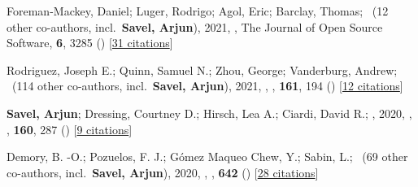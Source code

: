\item[{\color{numcolor}\scriptsize4}] Foreman-Mackey, Daniel; Luger, Rodrigo; Agol, Eric; Barclay, Thomas; \etal\ ({12} other co-authors, incl.\ \textbf{Savel, Arjun}), 2021, , The Journal of Open Source Software, \textbf{6}, 3285 () [\href{https://ui.adsabs.harvard.edu/abs/2021JOSS....6.3285F}{31 citations}]

\item[{\color{numcolor}\scriptsize3}] Rodriguez, Joseph E.; Quinn, Samuel N.; Zhou, George; Vanderburg, Andrew; \etal\ ({114} other co-authors, incl.\ \textbf{Savel, Arjun}), 2021, , \aj, \textbf{161}, 194 () [\href{https://ui.adsabs.harvard.edu/abs/2021AJ....161..194R}{12 citations}]

\item[{\color{numcolor}\scriptsize2}] \textbf{Savel, Arjun}; Dressing, Courtney D.; Hirsch, Lea A.; Ciardi, David R.; \etal, 2020, , \aj, \textbf{160}, 287 () [\href{https://ui.adsabs.harvard.edu/abs/2020AJ....160..287S}{9 citations}]

\item[{\color{numcolor}\scriptsize1}] Demory, B. -O.; Pozuelos, F. J.; G{\'o}mez Maqueo Chew, Y.; Sabin, L.; \etal\ ({69} other co-authors, incl.\ \textbf{Savel, Arjun}), 2020, , \aanda, \textbf{642} () [\href{https://ui.adsabs.harvard.edu/abs/2020A&A...642A..49D}{28 citations}]